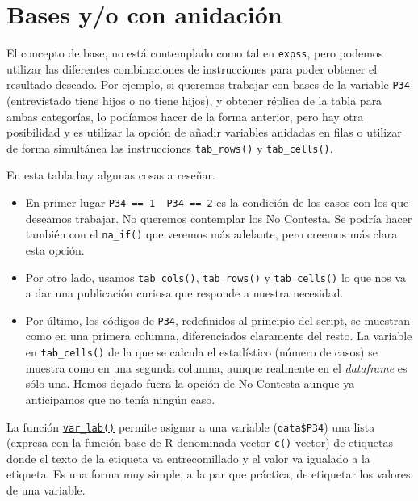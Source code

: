 \documentclass[
]{book}
\providecommand{\tightlist}{%
  \setlength{\itemsep}{0pt}\setlength{\parskip}{0pt}}
\begin{document}
\hypertarget{bases-yo-con-anidaciuxf3n}{%
\section{Bases y/o con anidación}\label{bases-yo-con-anidaciuxf3n}}

El concepto de base, no está contemplado como tal en \texttt{expss}, pero podemos utilizar las diferentes combinaciones de instrucciones para poder obtener el resultado deseado. Por ejemplo, si queremos trabajar con bases de la variable \texttt{P34} (entrevistado tiene hijos o no tiene hijos), y obtener réplica de la tabla para ambas categorías, lo podíamos hacer de la forma anterior, pero hay otra posibilidad y es utilizar la opción de añadir variables anidadas en filas o utilizar de forma simultánea las instrucciones \texttt{tab\_rows()} y \texttt{tab\_cells()}.

En esta tabla hay algunas cosas a reseñar.

\begin{itemize}
\tightlist
\item
  En primer lugar \texttt{P34\ ==\ 1\ \textbar{}\ P34\ ==\ 2} es la condición de los casos con los que deseamos trabajar. No queremos contemplar los No Contesta. Se podría hacer también con el \texttt{na\_if()} que veremos más adelante, pero creemos más clara esta opción.
\item
  Por otro lado, usamos \texttt{tab\_cols()}, \texttt{tab\_rows()} y \texttt{tab\_cells()} lo que nos va a dar una publicación curiosa que responde a nuestra necesidad.
\item
  Por último, los códigos de \texttt{P34}, redefinidos al principio del script, se muestran como en una primera columna, diferenciados claramente del resto. La variable en \texttt{tab\_cells()} de la que se calcula el estadístico (número de casos) se muestra como en una segunda columna, aunque realmente en el \emph{dataframe} es sólo una. Hemos dejado fuera la opción de No Contesta aunque ya anticipamos que no tenía ningún caso.
\end{itemize}

La función \href{https://rdrr.io/cran/expss/man/var_lab.html}{\texttt{var\_lab()}} permite asignar a una variable (\texttt{data\$P34}) una lista (expresa con la función base de R denominada vector \texttt{c()} vector) de etiquetas donde el texto de la etiqueta va entrecomillado y el valor va igualado a la etiqueta. Es una forma muy simple, a la par que práctica, de etiquetar los valores de una variable.
\end{document}
